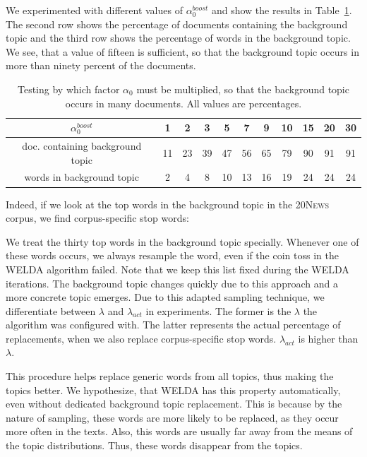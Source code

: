 \documentclass[
        a4paper,
        titlepage,
        twoside,
        parskip
        ]{scrbook}
\newcommand{\ra}[1]{\renewcommand{\arraystretch}{#1}}
\theoremstyle{break}
\begin{document}
We experimented with different values of $\alpha_0^{boost}$ and show the results in Table~\ref{table:alpha0_boost}.
The second row shows the percentage of documents containing the background topic and the third row shows the percentage of words in the background topic.
We see, that a value of fifteen is sufficient, so that the background topic occurs in more than ninety percent of the documents.
\begin{table}[]
  \ra{1.2}
  \centering
  \caption{Testing by which factor $\alpha_0$ must be multiplied, so that the background topic occurs in many documents.
  All values are percentages.}
  \label{table:alpha0_boost}
  \begin{tabular}{ccccccccccc}
    \toprule
    $\alpha_0^{boost}$                & 1     & 2     & 3     & 5     & 7     & 9     & 10    & 15    & 20    & 30    \\
    \midrule
  doc. containing background topic  & 11  & 23  & 39  & 47  & 56  & 65  & 79  & 90  & 91  & 91  \\
  words in background topic & 2   & 4   & 8   & 10  & 13  & 16  & 19  & 24  & 24  & 24 \\
    \bottomrule
  \end{tabular}
\end{table}
Indeed, if we look at the top words in the background topic in the \textsc{20News} corpus, we find corpus-specific stop words: \\
\noindent{}

We treat the thirty top words in the background topic specially.
Whenever one of these words occurs, we always resample the word, even if the coin toss in the WELDA algorithm failed.
Note that we keep this list fixed during the WELDA iterations.
The background topic changes quickly due to this approach and a more concrete topic emerges.
Due to this adapted sampling technique, we differentiate between $\lambda$ and $\lambda_{act}$ in experiments.
The former is the $\lambda$ the algorithm was configured with.
The latter represents the actual percentage of replacements, when we also replace corpus-specific stop words.
$\lambda_{act}$ is higher than $\lambda$.

This procedure helps replace generic words from all topics, thus making the topics better.
We hypothesize, that WELDA has this property automatically, even without dedicated background topic replacement.
This is because by the nature of sampling, these words are more likely to be replaced, as they occur more often in the texts.
Also, this words are usually far away from the means of the topic distributions.
Thus, these words disappear from the topics.
\end{document}
